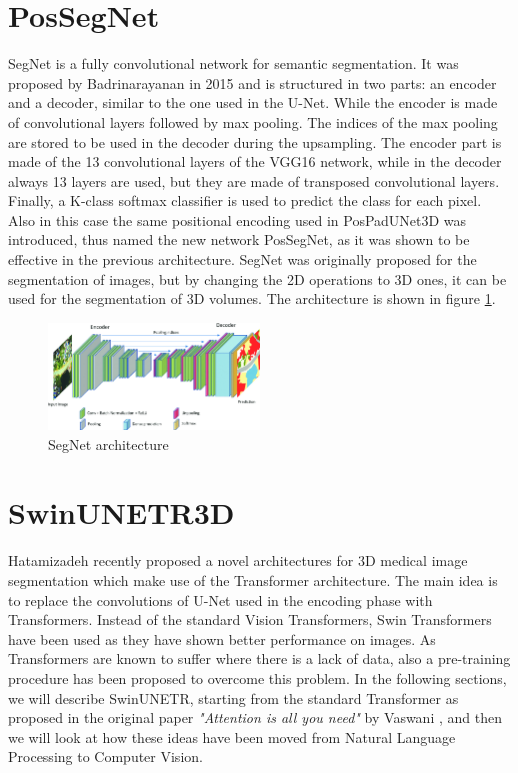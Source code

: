 \section{PosSegNet}
SegNet is a fully convolutional network for semantic segmentation. It was
proposed by Badrinarayanan \etal \cite{badrinarayanan2017segnet} in 2015 and is
structured in two parts: an encoder and a decoder, similar to the one used in
the U-Net. While the encoder is made of convolutional layers followed by max
pooling. The indices of the max pooling are stored to be used in the decoder
during the upsampling. The encoder part is made of the 13 convolutional layers
of the VGG16 network, while in the decoder always 13 layers are used, but they
are made of transposed convolutional layers. Finally, a K-class softmax
classifier is used to predict the class for each pixel.
Also in this case the same positional encoding used in PosPadUNet3D was
introduced, thus named the new network PosSegNet, as it was shown to be
effective in the previous architecture. SegNet was originally proposed for the
segmentation of images, but by changing the 2D operations to 3D ones, it can be
used for the segmentation of 3D volumes. The architecture is shown in figure
\ref{fig:segnet}.
\begin{figure}[h]
  \centering
  \includegraphics[width=0.5\textwidth]{Images/segnet.png}
  \caption{SegNet architecture}
  \label{fig:segnet}
\end{figure}

\section{SwinUNETR3D}
Hatamizadeh \etal \cite{hatamizadeh2022unetr,hatamizadeh2022swin} recently
proposed a novel architectures for 3D medical image segmentation which make use
of the Transformer architecture. The main idea is to replace the convolutions of
U-Net used in the encoding phase with Transformers. Instead of the standard
Vision Transformers, Swin Transformers have been used as they have shown better
performance on images. As Transformers are known to suffer where there is a lack
of data, also a pre-training procedure has been proposed \cite{tang2022self} to
overcome this problem. In the following sections, we will describe SwinUNETR,
starting from the standard Transformer as proposed in the original paper
\emph{"Attention is all you need"} by Vaswani \etal
\cite{vaswani2017attention}, and then we will look at how these ideas have been
moved from Natural Language Processing to Computer Vision.

